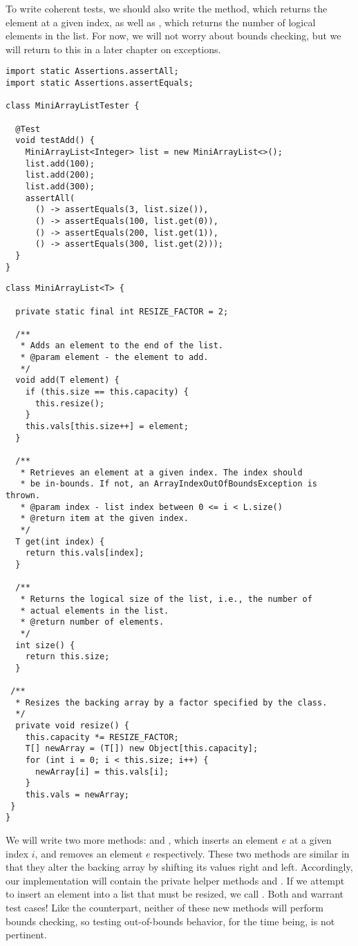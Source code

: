 To write coherent tests, we should also write the  method, which returns the element at a given index, as well as , which returns the number of logical elements in the list. 
For now, we will not worry about bounds checking, but we will return to this in a later chapter on exceptions.

\begin{lstlisting}[language=MyJava]
import static Assertions.assertAll;
import static Assertions.assertEquals;

class MiniArrayListTester {

  @Test
  void testAdd() {
    MiniArrayList<Integer> list = new MiniArrayList<>();
    list.add(100);
    list.add(200);
    list.add(300);
    assertAll(
      () -> assertEquals(3, list.size()),
      () -> assertEquals(100, list.get(0)),
      () -> assertEquals(200, list.get(1)),
      () -> assertEquals(300, list.get(2)));
  }
}
\end{lstlisting}

\begin{lstlisting}[language=MyJava]
class MiniArrayList<T> {

  private static final int RESIZE_FACTOR = 2;

  /**
   * Adds an element to the end of the list.
   * @param element - the element to add.
   */
  void add(T element) {
    if (this.size == this.capacity) { 
      this.resize(); 
    }
    this.vals[this.size++] = element;
  }

  /**
   * Retrieves an element at a given index. The index should
   * be in-bounds. If not, an ArrayIndexOutOfBoundsException is thrown.
   * @param index - list index between 0 <= i < L.size()
   * @return item at the given index.
   */
  T get(int index) { 
    return this.vals[index]; 
  }

  /**
   * Returns the logical size of the list, i.e., the number of 
   * actual elements in the list.
   * @return number of elements.
   */
  int size() { 
    return this.size; 
  }

 /**
  * Resizes the backing array by a factor specified by the class.
  */
  private void resize() {
    this.capacity *= RESIZE_FACTOR;
    T[] newArray = (T[]) new Object[this.capacity];
    for (int i = 0; i < this.size; i++) { 
      newArray[i] = this.vals[i]; 
    }
    this.vals = newArray;
 }
}
\end{lstlisting}

We will write two more methods:  and , which inserts an element $e$ at a given index $i$, and removes an element $e$ respectively. These two methods are similar in that they alter the backing array by shifting its values right and left. Accordingly, our implementation will contain the private helper methods  and . If we attempt to insert an element into a list that must be resized, we call . Both  and  warrant test cases! Like the  counterpart, neither of these new methods will perform bounds checking, so testing out-of-bounds behavior, for the time being, is not pertinent.

